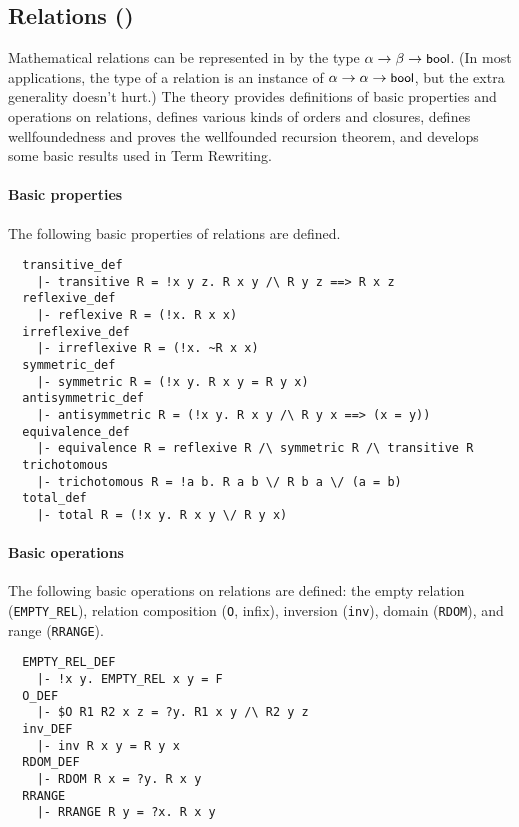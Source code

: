 \subsection{Relations ()}\label{relation}

Mathematical relations can be represented in \HOL{} by the type
$\alpha \to\beta\to\mbox{\small{\textbf{\sf{bool}}}}$. (In most applications, the type of a
relation is an instance of $\alpha \to\alpha\to\mbox{\small{\textbf{\sf{bool}}}}$, but the
extra generality doesn't hurt.) The theory 
provides definitions of basic properties and operations on relations,
defines various kinds of orders and closures, defines wellfoundedness
and proves the wellfounded recursion theorem, and develops some
basic results used in Term Rewriting.

\paragraph {Basic properties}

The following basic properties of relations are defined.
%
\begin{hol}
{\small
\begin{verbatim}
  transitive_def
    |- transitive R = !x y z. R x y /\ R y z ==> R x z
  reflexive_def
    |- reflexive R = (!x. R x x)
  irreflexive_def
    |- irreflexive R = (!x. ~R x x)
  symmetric_def
    |- symmetric R = (!x y. R x y = R y x)
  antisymmetric_def
    |- antisymmetric R = (!x y. R x y /\ R y x ==> (x = y))
  equivalence_def
    |- equivalence R = reflexive R /\ symmetric R /\ transitive R
  trichotomous
    |- trichotomous R = !a b. R a b \/ R b a \/ (a = b)
  total_def
    |- total R = (!x y. R x y \/ R y x)
\end{verbatim}}
\end{hol}

\paragraph{Basic operations}

The following basic operations on relations are defined: the empty
relation ({\small\verb+EMPTY_REL+}), relation composition
({\small\verb+O+, infix}), inversion ({\small\verb+inv+}),
domain ({\small\verb+RDOM+}), and range ({\small\verb+RRANGE+}).
%
\begin{hol}
{\small
\begin{verbatim}
  EMPTY_REL_DEF
    |- !x y. EMPTY_REL x y = F
  O_DEF
    |- $O R1 R2 x z = ?y. R1 x y /\ R2 y z
  inv_DEF
    |- inv R x y = R y x
  RDOM_DEF
    |- RDOM R x = ?y. R x y
  RRANGE
    |- RRANGE R y = ?x. R x y
\end{verbatim}}
\end{hol}

